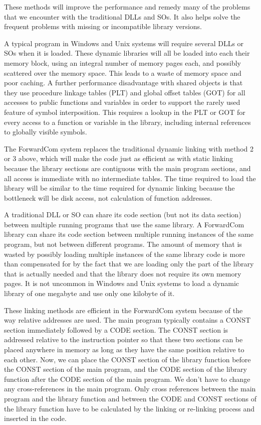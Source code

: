 \documentclass[forwardcom.tex]{subfiles}
\begin{document}
These methods will improve the performance and remedy many of the problems that we encounter with the traditional DLLs and SOs. It also helps solve the frequent problems with missing or incompatible library versions.
\vv

A typical program in Windows and Unix systems will require several DLLs or SOs when it is loaded. These dynamic libraries will all be loaded into each their memory block, using an integral number of memory pages each, and possibly scattered over the memory space. This leads to a waste of memory space and poor caching. A further performance disadvantage with shared objects is that they use procedure linkage tables (PLT) and global offset tables (GOT) for all accesses to public functions and variables in order to support the rarely used feature of symbol interposition. This requires a lookup in the PLT or GOT for every access to a function or variable in the library, including internal references to globally visible symbols.
\vv

The ForwardCom system replaces the traditional dynamic linking with method 2 or 3 above, which will make the code just as efficient as with static linking because the library sections are contiguous with the main program sections, and all access is immediate with no intermediate tables. The time required to load the library will be similar to the time required for dynamic linking because the bottleneck will be disk access, not calculation of function addresses. 
\vv

A traditional DLL or SO can share its code section (but not its data section) between multiple running programs that use the same library. A ForwardCom library can share its code section between multiple running instances of the same program, but not between different programs. The amount of memory that is wasted by possibly loading multiple instances of the same library code is more than compensated for by the fact that we are loading only the part of the library that is actually needed and that the library does not require its own memory pages. It is not uncommon in Windows and Unix systems to load a dynamic library of one megabyte and use only one kilobyte of it. 
\vv

These linking methods are efficient in the ForwardCom system because of the way relative addresses are used. The main program typically contains a CONST section immediately followed by a CODE section. The CONST section is addressed relative to the instruction pointer so that these two sections can be placed anywhere in memory as long as they have the same position relative to each other. Now, we can place the CONST section of the library function before the CONST section of the main program, and the CODE section of the library function after the CODE section of the main program. We don't have to change any cross-references in the main program. Only cross references between the main program and the library function and between the CODE and CONST sections of the library function have to be calculated by the linking or re-linking process and inserted in the code.
\vv
\end{document}
